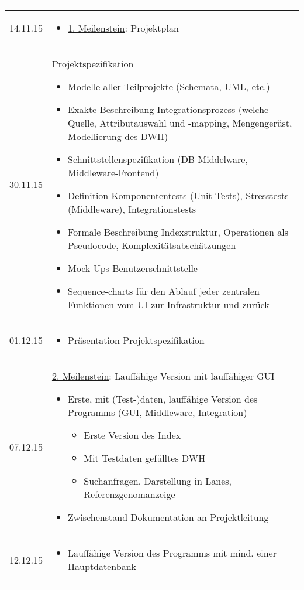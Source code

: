 \documentclass{scrartcl}
\begin{document}
\begin{longtable}{| l | p{14cm} |}
\begin{itemize}
\end{itemize}\\
\hline
14.11.15 & \begin{itemize}
 \item \underline{1. Meilenstein}: Projektplan
\end{itemize}\\
\hline
30.11.15 & Projektspezifikation
\begin{itemize}
  \item Modelle aller Teilprojekte (Schemata, UML, etc.) 
  \item Exakte Beschreibung Integrationsprozess (welche Quelle, Attributauswahl und -mapping,  Mengengerüst, Modellierung des DWH)
  \item Schnittstellenspezifikation (DB-Middelware, Middleware-Frontend)
  \item Definition Komponententests (Unit-Tests), Stresstests (Middleware), Integrationstests
  \item Formale Beschreibung Indexstruktur, Operationen als Pseudocode, Komplexitätsabschätzungen
  \item Mock-Ups Benutzerschnittstelle
  \item Sequence-charts für den Ablauf jeder zentralen Funktionen vom UI zur Infrastruktur und zurück
\end{itemize}\\
\hline
01.12.15 & \begin{itemize}
 \item Präsentation Projektspezifikation
\end{itemize}\\
\hline
07.12.15 & \underline{2. Meilenstein}: Lauffähige Version mit lauffähiger GUI
\begin{itemize}
 \item Erste, mit (Test-)daten, lauffähige Version des Programms (GUI, Middleware, Integration)
 \begin{itemize} 
  \item Erste Version des Index
  \item Mit Testdaten gefülltes DWH
  \item Suchanfragen, Darstellung in Lanes, Referenzgenomanzeige
 \end{itemize}
 \item Zwischenstand Dokumentation an Projektleitung
\end{itemize}\\
\hline
12.12.15 & \begin{itemize}
 \item Lauffähige Version des Programms mit mind. einer Hauptdatenbank

\end{itemize}
\end{longtable}
\end{document}
